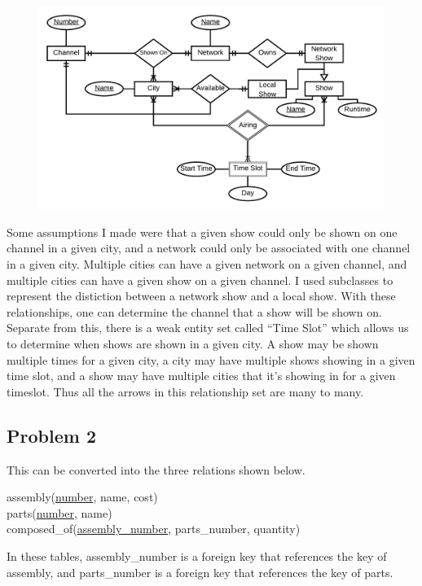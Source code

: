 \documentclass[12pt]{article}
\begin{document}
\begin{figure}[!ht]
    \begin{center}
        \hspace*{-5cm}
        \includegraphics[width=1.25\textwidth]{problem2-1.pdf}
        \hspace*{-5cm}
    \end{center}
\end{figure}
Some assumptions I made were that a given show could only be shown on one channel in a given city, and a network could only be associated with one
channel in a given city. Multiple cities can have a given network on a given channel, and multiple cities can have a given show on a given channel.
I used subclasses to represent the distiction between a network show and a local show. With these relationships, one can determine the channel
that a show will be shown on. Separate from this, there is a weak entity set called ``Time Slot'' which allows us to determine when shows are shown
in a given city. A show may be shown multiple times for a given city, a city may have multiple shows showing in a given time slot, and a show may
have multiple cities that it's showing in for a given timeslot. Thus all the arrows in this relationship set are many to many.

\subsection*{Problem 2}

This can be converted into the three relations shown below.
\begin{center}
        assembly(\underline{number}, name, cost)\\
        parts(\underline{number}, name)\\
        composed\_of(\underline{assembly\_number}, parts\_number, quantity)
\end{center}
In these tables, assembly\_number is a foreign key that references the key of assembly, and parts\_number is a foreign key that references the key of parts.
\end{document}
